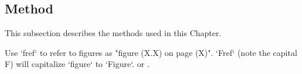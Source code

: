 \subsection{Method}
\label{sec:3-method}

This subsection describes the methods used in this Chapter.

Use `fref` to refer to figures as "figure (X.X) on page (X)". `Fref` (note the capital F) will capitalize `figure` to `Figure`. \eg {} or .

